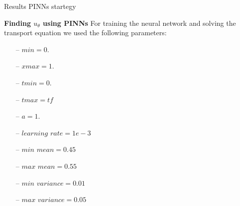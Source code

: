 \begin{frame}{Results PINNs startegy}

    \textbf{{Finding $u_\theta$ using PINNs}}
    For training the neural network and solving the transport equation we used the following parameters:
    \vspace{0.3cm}
    \begin{itemize}
        \item[--] $min = 0.$
        \item[--] $xmax = 1.$
        \item[--] $tmin = 0.$
        \item[--] $tmax = tf$
        \item[--] $a = 1.$
        \item[--] $learning$ $rate = 1e-3$
        \item[--] $min$ $mean = 0.45$
        \item[--] $max$ $mean = 0.55$
        \item[--] $min$ $variance = 0.01$
        \item[--] $max$ $variance = 0.05$
    \end{itemize}
   
\end{frame}
